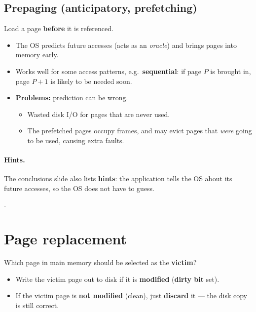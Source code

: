 \documentclass[11pt,a4paper]{article}
\makeatletter
\newcommand{\keepspace}[1]{\par\penalty-100\begingroup
  \setlength{\dimen@}{#1}\dimen@ii\pagegoal\advance\dimen@ii-\pagetotal
  \ifdim\dimen@>\dimen@ii\ifdim\dimen@ii>\z@\vfil\fi\break\fi\endgroup}
\makeatother
\begin{document}
\subsection{Prepaging (anticipatory, prefetching)}
\begin{defbox}[Prepaging]
Load a page \textbf{before} it is referenced.
\end{defbox}
\begin{itemize}
  \item The OS predicts future accesses (acts as an \emph{oracle}) and
        brings pages into memory early.
  \item Works well for some access patterns, e.g.\ \textbf{sequential}:
        if page \(P\) is brought in, page \(P+1\) is likely to be needed
        soon.
  \item \textbf{Problems:} prediction can be wrong.
        \begin{itemize}
          \item Wasted disk I/O for pages that are never used.
          \item The prefetched pages occupy frames, and may evict pages
                that \emph{were} going to be used, causing extra faults.
        \end{itemize}
\end{itemize}

\paragraph{Hints.} The conclusions slide also lists \textbf{hints}: the
application tells the OS about its future accesses, so the OS does not
have to guess.

\keepspace{10\baselineskip}
\section{Page replacement}

Which page in main memory should be selected as the \textbf{victim}?
\begin{itemize}
  \item Write the victim page out to disk if it is \textbf{modified}
        (\textbf{dirty bit} set).
  \item If the victim page is \textbf{not modified} (clean), just
        \textbf{discard} it --- the disk copy is still correct.
\end{itemize}
\end{document}
